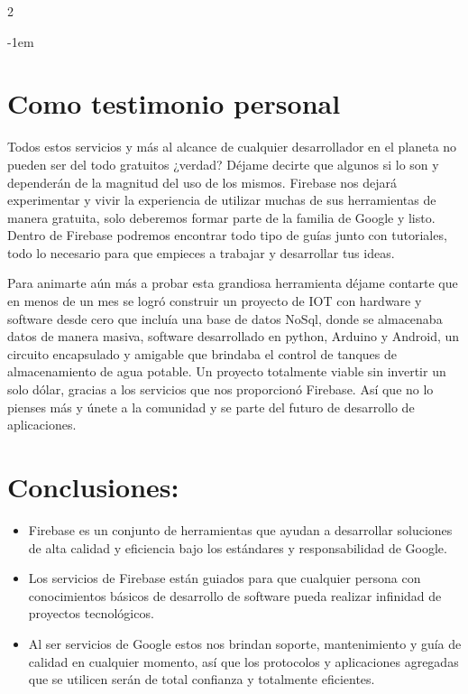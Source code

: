 \documentclass[12pt,spanish,Letterpaper,openany]{book}
\newenvironment{smalltextenv}
  {\begin{center}\kern-1em\color{fondotitulo}\small}%
  {\end{center}}%
\begin{document}
\begin {multicols}{2}
\begin {smalltextenv}
\end {smalltextenv}

\hypertarget{como-testimonio-personal}{%
\section{Como testimonio personal}\label{como-testimonio-personal}}

Todos estos servicios y más al alcance de cualquier desarrollador en el planeta no pueden ser del todo gratuitos ¿verdad? Déjame decirte que algunos si lo son y dependerán de la magnitud del uso de los mismos. Firebase nos dejará experimentar y vivir la experiencia de utilizar muchas de sus herramientas de manera gratuita, solo deberemos formar parte de la familia de Google y listo. Dentro de Firebase podremos encontrar todo tipo de guías junto con tutoriales, todo lo necesario para que empieces a trabajar y desarrollar tus ideas.

Para animarte aún más a probar esta grandiosa herramienta déjame contarte que en menos de un mes se logró construir un proyecto de IOT con hardware y software desde cero que incluía una base de datos NoSql, donde se almacenaba datos de manera masiva, software desarrollado en python, Arduino y Android, un circuito encapsulado y amigable que brindaba el control de tanques de almacenamiento de agua potable. Un proyecto totalmente viable sin invertir un solo dólar, gracias a los servicios que nos proporcionó Firebase. Así que no lo pienses más y únete a la comunidad y se parte del futuro de desarrollo de aplicaciones.

\hypertarget{conclusiones}{%
\section{Conclusiones:}\label{conclusiones}}

\begin{itemize}
\item
  Firebase es un conjunto de herramientas que ayudan a desarrollar soluciones de alta calidad y eficiencia bajo los estándares y responsabilidad de Google.
\item
  Los servicios de Firebase están guiados para que cualquier persona con conocimientos básicos de desarrollo de software pueda realizar infinidad de proyectos tecnológicos.
\item
  Al ser servicios de Google estos nos brindan soporte, mantenimiento y guía de calidad en cualquier momento, así que los protocolos y aplicaciones agregadas que se utilicen serán de total confianza y totalmente eficientes.
\end{itemize}


\end{multicols}
\end{document}
